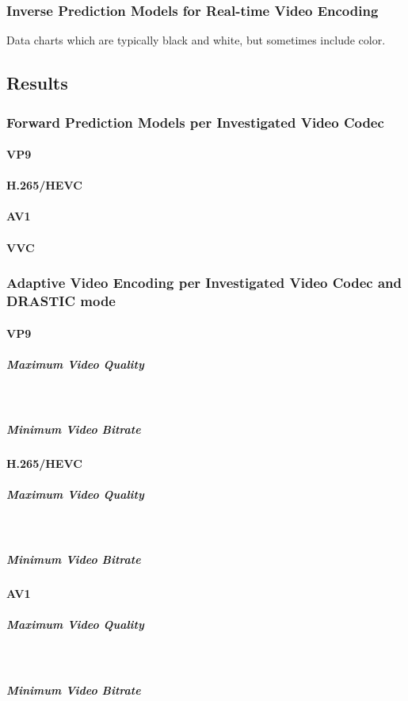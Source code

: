 \documentclass{ieeeaccess}
\begin{document}
\subsubsection{Inverse Prediction Models for Real-time Video Encoding}
{Data charts which are typically black and white, but sometimes include 
color.}

\subsection{Results}

\subsubsection{Forward Prediction Models per Investigated Video Codec}

\paragraph{VP9}
\paragraph{H.265/HEVC}
\paragraph{AV1}
\paragraph{VVC}

\subsubsection{Adaptive Video Encoding per Investigated Video Codec and DRASTIC mode}

\paragraph{VP9}
\subparagraph{Maximum Video Quality}
\\
\subparagraph{Minimum Video Bitrate}
\paragraph{H.265/HEVC}
\subparagraph{Maximum Video Quality}
\\
\subparagraph{Minimum Video Bitrate}
\paragraph{AV1}
\subparagraph{Maximum Video Quality}
\\
\subparagraph{Minimum Video Bitrate}
\end{document}
